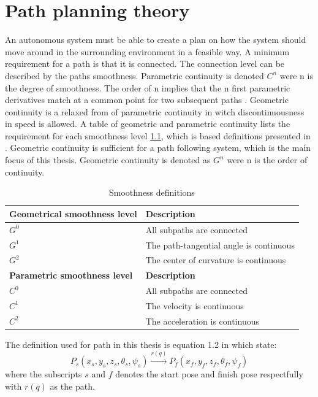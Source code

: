 \chapter{Path planning theory}
An autonomous system must be able to create a plan on how the system should move around in the surrounding environment in a feasible way. A minimum requirement for a path is that it is connected. The connection level can be described by the paths smoothness. Parametric continuity is denoted $C^n$ were n is the degree of smoothness. The order of n implies that the n first parametric derivatives match at a common point for two subsequent paths \citep{barsky1989geometric}. Geometric continuity is a relaxed from of parametric continuity in witch discontinuousness in speed is allowed. A table of geometric and parametric continuity lists the requirement for each smoothness level \ref{TB:SmoothnessDescriptions}, which is based definitions presented in \citep{barsky1989geometric}.
Geometric continuity is sufficient for a path following system, which is the main focus of this thesis. Geometric continuity is denoted as $G^n$ were n is the order of continuity.

\begin{table}[H]
\begin{center}
\begin{tabular}{| l | | l |}
\hline
\textbf{Geometrical smoothness level} & \textbf{Description} \\ \hline
$G^0$ & All subpaths are connected \\ \hline
$G^1$ & The path-tangential angle is continuous \\ \hline
$G^2$ & The center of curvature is continuous \\ \hline
\textbf{Parametric smoothness level} & \textbf{Description} \\ \hline
$C^0$ & All subpaths are connected \\ \hline
$C^1$ & The velocity is continuous \\ \hline
$C^2$ & The acceleration is continuous \\ \hline
\end{tabular}
\end{center}
\caption{Smoothness definitions}
\label{TB:SmoothnessDescriptions}
\end{table} 

The definition used for path in this thesis is equation 1.2 in \citep{tsourdos2010cooperative} which state:
\begin{equation}
P_s(x_s,y_s,z_s,\theta_s,\psi_s) \xrightarrow{r(q)} P_f(x_f,y_f,z_f,\theta_f,\psi_f)
\end{equation}
where the subscripts $s$ and $f$ denotes the start pose and finish pose respectfully with $r(q)$ as the path.

